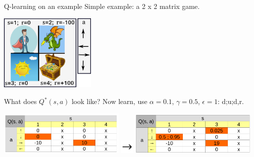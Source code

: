 \documentclass{beamer}
\begin{document}
\begin{frame}{Q-learning on an example}
    Simple example: a 2 x 2 matrix game.

    \begin{center}
      \includegraphics[width=0.35\textwidth]{./Figures/ANNs_reinforcement_learning/Q_learning_example}
    \end{center}

    What does $Q^{*}(s, a)$ look like? Now learn, use $\alpha = 0.1$, $\gamma = 0.5$, $\epsilon = 1$: d;u;d,r.

    \begin{center}
      \includegraphics[width=0.46\textwidth]{./Figures/ANNs_reinforcement_learning/Q_learning_example_2}
      \includegraphics[width=0.05\textwidth]{./Figures/ANNs_reinforcement_learning/arrow_right}
      \includegraphics[width=0.46\textwidth]{./Figures/ANNs_reinforcement_learning/Q_learning_example_3}
    \end{center}
\end{frame}
\end{document}

